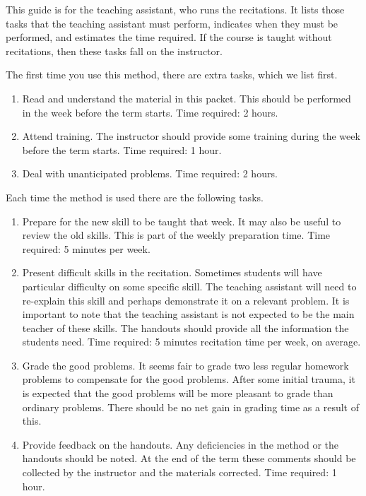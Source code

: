 %
%
%
%
%
%
%



This guide is for the teaching assistant, who runs the recitations.
It lists those tasks that the teaching assistant must perform, indicates
when they must be performed, and estimates the time required.
If the course is taught without recitations, then these tasks
fall on the instructor.

The first time you use this method, there are extra
tasks, which we list first.
\begin{enumerate}
	\item Read and understand the material in this packet. This
should be performed in the week before the term starts.
Time required: 2 hours.
	\item Attend training. The instructor should provide some training
during the week before the term starts. Time required: 1 hour.
	\item Deal with unanticipated problems. Time required: 2 hours.
\end{enumerate}

Each time the method is used there are the following tasks.
\begin{enumerate}
	\item Prepare for the new skill to be taught that week. It may also
be useful to review the old skills. This is part of the weekly preparation
time. Time required: 5 minutes per week.
	\item Present difficult skills in the recitation. Sometimes
students will have particular difficulty on some specific skill. The
teaching assistant will need to re-explain this skill and perhaps
demonstrate it on a relevant problem. It is important to note that the
teaching assistant is not expected to be the main teacher of these
skills. The handouts should provide all the information the students
need. Time required: 5 minutes recitation time per week, on average.
	\item Grade the good problems. It seems fair to
grade two less regular homework problems to compensate for the good
problems. After some initial trauma, it is expected that the good problems
will be more pleasant to grade than ordinary problems. There should be no
net gain in grading time as a result of this.
	\item Provide feedback on the handouts. Any deficiencies in the
method or the handouts should be noted. At the end of the term these
comments should be collected by the instructor and the materials
corrected. Time required: 1 hour. 
\end{enumerate}
